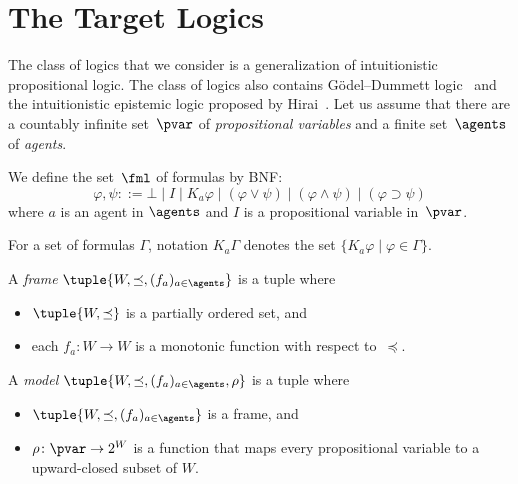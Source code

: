 \documentclass[doctor]{iscs-thesis}
\begin{document}
\section{The Target Logics}
 \label{logic}

The class of logics that we consider is a generalization of
intuitionistic propositional logic.
The class of logics also contains G\"{o}del--Dummett logic~\cite{dummett59}
and the intuitionistic epistemic logic proposed by 
Hirai~\cite{lpar-hirai}.
Let us assume that
there are a countably infinite set~$\pvar$ of \textit{propositional variables} and a 
finite set~$\agents$ of \textit{agents}. 

\begin{definition}
We define the set~$\fml$ of formulas by BNF:
\[
 \varphi,\psi ::= \bot\mid I\mid K_a\varphi\mid (\varphi\vee\psi)\mid
 (\varphi\wedge\psi)\mid (\varphi\supset\psi)
\]
 where $a$ is an agent in $\agents$
 and $I$ is a propositional variable in~$\pvar$.
\end{definition}

For a set of formulas $\Gamma$\!, notation $K_a\Gamma$ denotes the set
$\{K_a\varphi\mid\varphi\in\Gamma\}$\enspace.

\begin{definition}
A \textit{frame} $\tuple{W,\preceq,(f_a)_{a\in \agents}}$ is a tuple where
\begin{itemize}
 \item $\tuple{W,\preceq}$ is a partially ordered set, and
 \item each $f_a\colon W\rightarrow W$ is a monotonic function with
       respect to~$\preceq$.
\end{itemize} 
\end{definition}

\begin{definition}
A \textit{model} $\tuple{W,\preceq, (f_a)_{a\in \agents},\rho}$ is a tuple where
\begin{itemize}
 \item $\tuple{W,\preceq,(f_a)_{a\in \agents}}$ is a frame, and
 \item $\rho\colon \pvar\rightarrow 2^W$ is a function that maps every
       propositional variable to a upward-closed subset of $W$\!.
\end{itemize} 
\end{definition}
\end{document}
